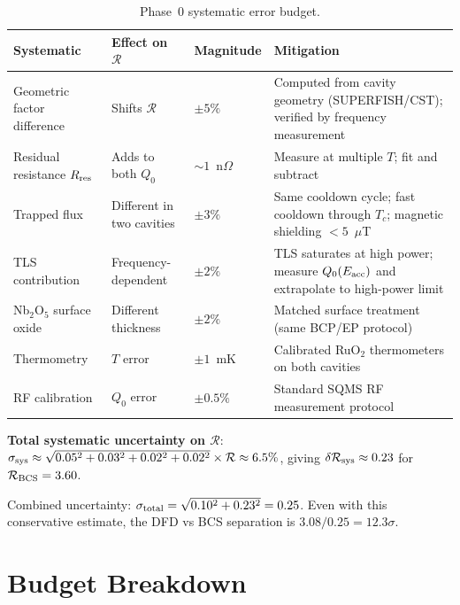 \documentclass[11pt]{article}
\theoremstyle{definition}
\theoremstyle{remark}
\begin{document}
\begin{table}[H]
\centering
\caption{Phase~0 systematic error budget.}
\renewcommand{\arraystretch}{1.3}
\begin{tabular}{@{}p{4cm}p{2cm}p{2cm}p{4.5cm}@{}}
\toprule
\textbf{Systematic} & \textbf{Effect on $\mathcal{R}$}
& \textbf{Magnitude} & \textbf{Mitigation} \\
\midrule
\rowcolor{rowhi}
Geometric factor difference & Shifts $\mathcal{R}$ & $\pm 5\%$
& Computed from cavity geometry (SUPERFISH/CST); verified by
  frequency measurement \\
\rowcolor{rowhi}
Residual resistance $R_{\rm res}$ & Adds to both $Q_0$ & $\sim 1$~n$\Omega$
& Measure at multiple $T$; fit and subtract \\
\rowcolor{rowmed}
Trapped flux & Different in two cavities & $\pm 3\%$
& Same cooldown cycle; fast cooldown through $T_c$;
  magnetic shielding $< 5$~$\mu$T \\
\rowcolor{rowmed}
TLS contribution & Frequency-dependent & $\pm 2\%$
& TLS saturates at high power; measure $Q_0(E_{\rm acc})$
  and extrapolate to high-power limit \\
\rowcolor{rowmed}
Nb$_2$O$_5$ surface oxide & Different thickness & $\pm 2\%$
& Matched surface treatment (same BCP/EP protocol) \\
\rowcolor{rowok}
Thermometry & $T$ error & $\pm 1$~mK
& Calibrated RuO$_2$ thermometers on both cavities \\
\rowcolor{rowok}
RF calibration & $Q_0$ error & $\pm 0.5\%$
& Standard SQMS RF measurement protocol \\
\bottomrule
\end{tabular}
\end{table}

\textbf{Total systematic uncertainty on $\mathcal{R}$}:
$\sigma_{\rm sys} \approx \sqrt{0.05^2 + 0.03^2 + 0.02^2 + 0.02^2}
\times \mathcal{R} \approx 6.5\%$, giving $\delta\mathcal{R}_{\rm sys}
\approx 0.23$ for $\mathcal{R}_{\rm BCS} = 3.60$.

Combined uncertainty: $\sigma_{\rm total} = \sqrt{0.10^2 + 0.23^2}
= 0.25$. Even with this conservative estimate, the DFD vs BCS
separation is $3.08/0.25 = 12.3\sigma$.


\section{Budget Breakdown}
\end{document}
